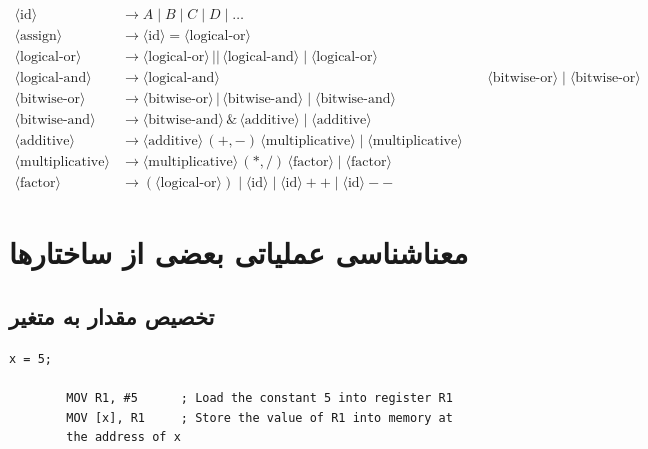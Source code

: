 \documentclass[12pt, a4paper]{report}
\begin{document}
\begin{align*}
	\langle \text{id} \rangle &\to A \mid B \mid C \mid D \mid \dots \\
	\langle \text{assign} \rangle &\to \langle \text{id} \rangle = \langle \text{logical-or} \rangle \\
	\langle \text{logical-or} \rangle &\to \langle \text{logical-or} \rangle \, || \, \langle \text{logical-and} \rangle \mid \langle \text{logical-or} \rangle \\
	\langle \text{logical-and} \rangle &\to \langle \text{logical-and} \rangle \, && \, \langle \text{bitwise-or} \rangle \mid \langle \text{bitwise-or} \rangle \\
	\langle \text{bitwise-or} \rangle &\to \langle \text{bitwise-or} \rangle \, | \, \langle \text{bitwise-and} \rangle \mid \langle \text{bitwise-and} \rangle \\
	\langle \text{bitwise-and} \rangle &\to \langle \text{bitwise-and} \rangle \, \& \, \langle \text{additive} \rangle \mid \langle \text{additive} \rangle \\
	\langle \text{additive} \rangle &\to \langle \text{additive} \rangle \, (+, -) \, \langle \text{multiplicative} \rangle \mid \langle \text{multiplicative} \rangle \\
	\langle \text{multiplicative} \rangle &\to \langle \text{multiplicative} \rangle \, (*, /) \, \langle \text{factor} \rangle \mid \langle \text{factor} \rangle \\
	\langle \text{factor} \rangle &\to (\langle \text{logical-or} \rangle) \mid \langle \text{id} \rangle \mid \langle \text{id} \rangle++ \mid \langle \text{id} \rangle--
\end{align*}
\section{معناشناسی عملیاتی بعضی از ساختارها}

\subsection{تخصیص مقدار به متغیر}
\begin{LTR} %
	\begin{lstlisting}[breaklines=true]
		x = 5;
		
		MOV R1, #5      ; Load the constant 5 into register R1
		MOV [x], R1     ; Store the value of R1 into memory at
		the address of x
	\end{lstlisting}
\end{LTR}
\end{document}
